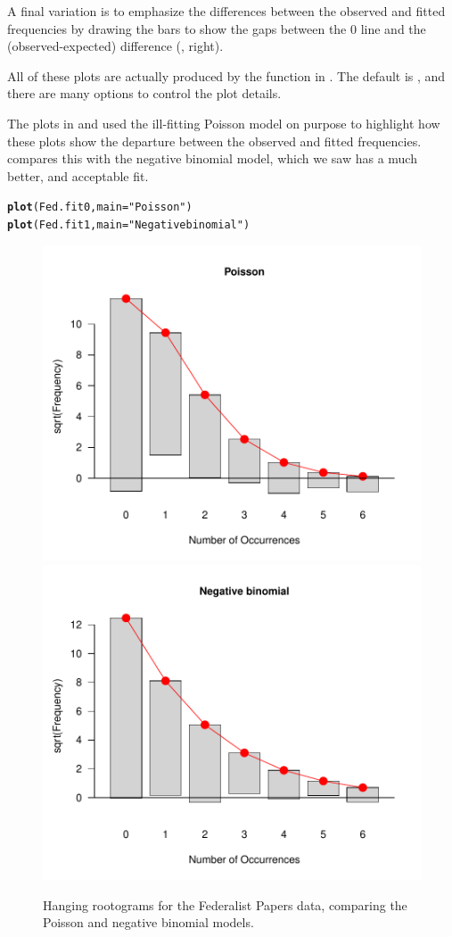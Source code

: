 \documentclass[11pt]{book}\usepackage[]{graphicx}\usepackage[]{color}
\makeatletter
\newcommand{\hlstr}[1]{\textcolor[rgb]{0.192,0.494,0.8}{#1}}%
\newcommand{\hlstd}[1]{\textcolor[rgb]{0.345,0.345,0.345}{#1}}%
\newcommand{\hlkwc}[1]{\textcolor[rgb]{0.333,0.667,0.333}{#1}}%
\newcommand{\hlkwd}[1]{\textcolor[rgb]{0.737,0.353,0.396}{\textbf{#1}}}%
\newenvironment{kframe}{%
 \def\at@end@of@kframe{}%
 \ifinner\ifhmode%
  \def\at@end@of@kframe{\end{minipage}}%
  \begin{minipage}{\columnwidth}%
 \fi\fi%
 \def\FrameCommand##1{\hskip\@totalleftmargin \hskip-\fboxsep
 \colorbox{shadecolor}{##1}\hskip-\fboxsep
     \hskip-\linewidth \hskip-\@totalleftmargin \hskip\columnwidth}%
 \MakeFramed {\advance\hsize-\width
   \@totalleftmargin\z@ \linewidth\hsize
   \@setminipage}}%
 {\par\unskip\endMakeFramed%
 \at@end@of@kframe}
\newenvironment{knitrout}{}{} %
\renewenvironment{knitrout}{\small\renewcommand{\baselinestretch}{.85}}{} %
\makeatother
\begin{document}
A final variation is to emphasize the differences between the
observed and fitted frequencies by drawing the bars to show the
gaps between the 0 line and the (observed-expected) difference
(, right).

All of these plots are actually produced by the  function
in .  The default is , and there are many
options to control the plot details.

The plots in  and 
used the ill-fitting Poisson model on purpose to highlight how these
plots show the departure between the observed and fitted frequencies.
 compares this with the negative
binomial model,  which we saw has a much better, and acceptable
fit.
\begin{knitrout}
\color{fgcolor}\begin{kframe}
\begin{alltt}
\hlkwd{plot}\hlstd{(Fed.fit0,} \hlkwc{main}\hlstd{=}\hlstr{"Poisson"}\hlstd{)}
\hlkwd{plot}\hlstd{(Fed.fit1,} \hlkwc{main}\hlstd{=}\hlstr{"Negative binomial"}\hlstd{)}
\end{alltt}
\end{kframe}\begin{figure}[htbp]


\centerline{\includegraphics[width=.48\textwidth]{ch03/fig/Fed0-Fed11} 
\includegraphics[width=.48\textwidth]{ch03/fig/Fed0-Fed12} }

\caption[Hanging rootograms for the Federalist Papers data, comparing the Poisson and negative binomial models]{Hanging rootograms for the Federalist Papers data, comparing the Poisson and negative binomial models.\label{fig:Fed0-Fed1}}
\end{figure}


\end{knitrout}
\end{document}
